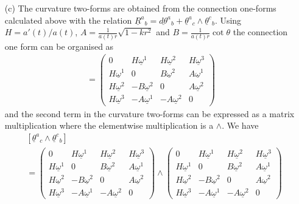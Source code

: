 \documentclass[10pt, a4paper]{article}
\begin{document}
{\begin{enumerate}
  \item[(c)] The curvature two-forms are obtained from the connection one-forms calculated above with the relation $\underline{R}^a{}_b=\underline{d \theta}^a{}_b+\underline{\theta}^a{}_c \wedge \underline{\theta}^c{}_b$. Using $H = a'(t)/a(t)$, $A = \frac{1}{a(t)r}\sqrt{1-k r^2}$ and $B = \frac{1}{a(t)r}\cot \theta$ the connection one form can be organised as 
  \begin{align*}
    [\underline{\theta}^{a}{}_{b}] = 
    \begin{pmatrix}
      0 & H\underline{\omega}^1 & H\underline{\omega}^2 & H\underline{\omega}^3\\
      H\underline{\omega}^1 & 0 & B\underline{\omega}^2 & A\underline{\omega}^1\\
      H\underline{\omega}^2 & -B \underline{\omega}^2 & 0 & A\underline{\omega}^2\\
      H\underline{\omega}^3 & -A\underline{\omega}^1 & -A\underline{\omega}^2 & 0
    \end{pmatrix} 
  \end{align*}
  and the second term in the curvature two-forms can be expressed as a matrix multiplication where the elementwise multiplication is a $\wedge$. We have 
  \begin{align*}
    &[\underline{\theta}^a{}_c \wedge \underline{\theta}^c{}_b]\\
    &= \begin{pmatrix}
      0 & H\underline{\omega}^1 & H\underline{\omega}^2 & H\underline{\omega}^3\\
      H\underline{\omega}^1 & 0 & B\underline{\omega}^2 & A\underline{\omega}^1\\
      H\underline{\omega}^2 & -B \underline{\omega}^2 & 0 & A\underline{\omega}^2\\
      H\underline{\omega}^3 & -A\underline{\omega}^1 & -A\underline{\omega}^2 & 0
    \end{pmatrix} \wedge \begin{pmatrix}
      0 & H\underline{\omega}^1 & H\underline{\omega}^2 & H\underline{\omega}^3\\
      H\underline{\omega}^1 & 0 & B\underline{\omega}^2 & A\underline{\omega}^1\\
      H\underline{\omega}^2 & -B \underline{\omega}^2 & 0 & A\underline{\omega}^2\\
      H\underline{\omega}^3 & -A\underline{\omega}^1 & -A\underline{\omega}^2 & 0
    \end{pmatrix} \\

\end{align*}
\end{enumerate}}
\end{document}
